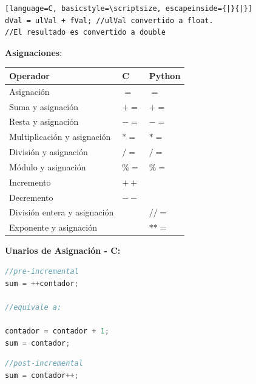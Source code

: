 \documentclass{article}
\begin{document}
\begin{itemize}
\begin{minipage}[h]{0.45\textwidth}
\begin{lstlisting}[language=C, basicstyle=\scriptsize, escapeinside={|}{|}]
dVal = ulVal + fVal; //ulVal convertido a float.
//El resultado es convertido a double            
	\end{lstlisting}
\end{minipage}
\hspace{0.5cm}
\begin{minipage}[h]{0.45\textwidth}
\item \textbf{Asignaciones}:

\medskip
\begin{tabular}{|l|l|l|}\hline
	\textbf{Operador} &\textbf{C} & \textbf{Python}   \\ \hline 
	Asignación         & $=$  & $=$  \\  \hline
	Suma y asignación       & $+=$ & $+=$ \\  \hline
	Resta y asignación          & $-=$ & $-=$  \\  \hline
	Multiplicación y asignación       & $*=$ & $*=$ \\  \hline
	División y asignación   & $/=$ & $/=$  \\  \hline
	Módulo y asignación   & $\%=$ & $\%=$  \\  \hline
	Incremento    & $++$ &  \\  \hline
	Decremento   & $--$ &   \\  \hline
	División entera y asignación   &  & $//=$  \\  \hline
	Exponente y asignación   & & $**=$  \\  \hline
\end{tabular}
\end{minipage}

\item \textbf{Unarios de Asignación - C:}

\begin{minipage}[h]{0.45\textwidth}
\begin{lstlisting}[language=C, basicstyle=\scriptsize] 
//pre-incremental
sum = ++contador; 

//equivale a:

contador = contador + 1;
sum = contador;
\end{lstlisting}
\end{minipage}
\begin{minipage}[h]{0.45\textwidth}
\begin{lstlisting}[language=C, basicstyle=\scriptsize] 
//post-incremental
sum = contador++;
 

\end{lstlisting}
\end{minipage}
\end{itemize}
\end{document}
